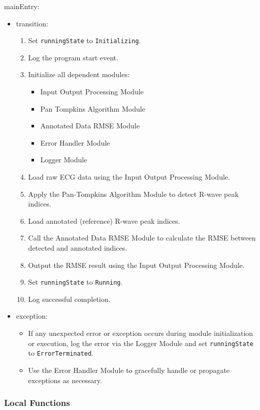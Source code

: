 \documentclass[12pt, titlepage]{article}
\begin{document}
\noindent mainEntry:
\begin{itemize}
\item transition:
    \begin{enumerate}
    \item Set \texttt{runningState} to \texttt{Initializing}.
    \item Log the program start event.
    \item Initialize all dependent modules:
        \begin{itemize}
        \item Input Output Processing Module
        \item Pan Tompkins Algorithm Module
        \item Annotated Data RMSE Module
        \item Error Handler Module
        \item Logger Module
        \end{itemize}
    \item Load raw ECG data using the Input Output Processing Module.
    \item Apply the Pan-Tompkins Algorithm Module to detect R-wave peak indices.
    \item Load annotated (reference) R-wave peak indices.
    \item Call the Annotated Data RMSE Module to calculate the RMSE between
    detected and annotated indices.
    \item Output the RMSE result using the Input Output Processing Module.
    \item Set \texttt{runningState} to \texttt{Running}.
    \item Log successful completion.
    \end{enumerate}
\item exception:
    \begin{itemize}
    \item If any unexpected error or exception occurs during module
    initialization or execution, log the error via the Logger Module and set
    \texttt{runningState} to \texttt{ErrorTerminated}.
    \item Use the Error Handler Module to gracefully handle or propagate
    exceptions as necessary.
    \end{itemize}
\end{itemize}

\subsubsection{Local Functions}
\end{document}
